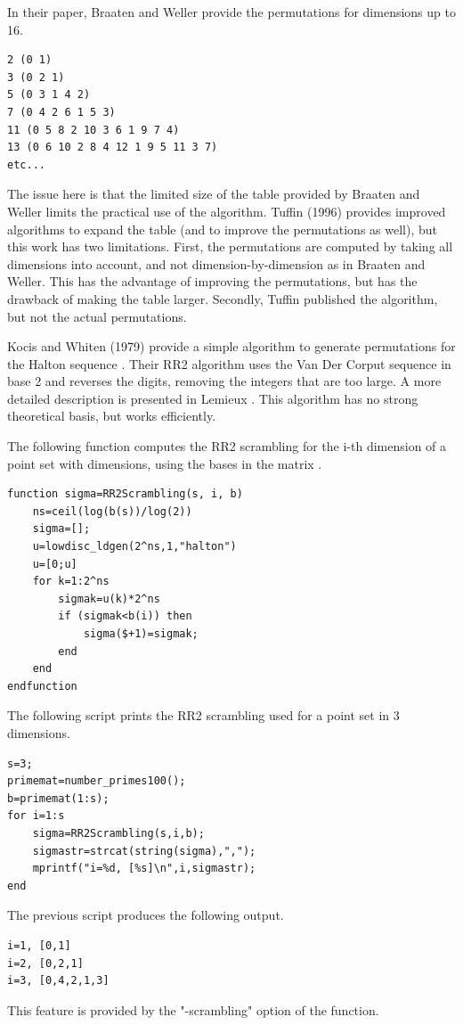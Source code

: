 In their paper, Braaten and Weller provide the permutations
for dimensions up to 16.

\lstset{language=scilabscript}
\begin{lstlisting}
2 (0 1)
3 (0 2 1)
5 (0 3 1 4 2)
7 (0 4 2 6 1 5 3)
11 (0 5 8 2 10 3 6 1 9 7 4)
13 (0 6 10 2 8 4 12 1 9 5 11 3 7)
etc...
\end{lstlisting}

The issue here is that the limited size of the
table provided by Braaten and Weller limits the practical use of the
algorithm.
Tuffin (1996) provides improved algorithms to expand the table
(and to improve the permutations as well), but this work has
two limitations. 
First, the permutations are computed by taking all dimensions
into account, and not dimension-by-dimension as in
Braaten and Weller.
This has the advantage of improving the permutations, but has
the drawback of making the table larger.
Secondly, Tuffin published the algorithm, but not the actual permutations.

Kocis and Whiten (1979) provide a simple algorithm to generate
permutations for the Halton sequence \cite{Kocis1997}.
Their RR2 algorithm uses the Van Der Corput sequence in base 2 and
reverses the digits, removing the integers that are too large.
A more detailed description is presented in Lemieux \cite{Lemieux2009}.
This algorithm has no strong theoretical basis, but works
efficiently.

The following function computes the RR2 scrambling
for the i-th dimension of a point set with  dimensions,
using the bases in the matrix .

\lstset{language=scilabscript}
\begin{lstlisting}
function sigma=RR2Scrambling(s, i, b)
    ns=ceil(log(b(s))/log(2))
    sigma=[];
    u=lowdisc_ldgen(2^ns,1,"halton")
    u=[0;u]
    for k=1:2^ns
        sigmak=u(k)*2^ns
        if (sigmak<b(i)) then
            sigma($+1)=sigmak;
        end
    end
endfunction
\end{lstlisting}

    
      The following script prints the RR2 scrambling
      used for a point set in 3 dimensions.
    

\lstset{language=scilabscript}
\begin{lstlisting}
s=3;
primemat=number_primes100();
b=primemat(1:s);
for i=1:s
    sigma=RR2Scrambling(s,i,b);
    sigmastr=strcat(string(sigma),",");
    mprintf("i=%d, [%s]\n",i,sigmastr);
end
\end{lstlisting}

    
      The previous script produces the following output.
    

\lstset{language=scilabscript}
\begin{lstlisting}
i=1, [0,1]
i=2, [0,2,1]
i=3, [0,4,2,1,3]
\end{lstlisting}

    
      This feature is provided by the "-scrambling" option of the
       function.
